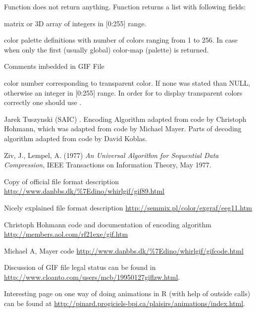 \begin{Value}
Function  does not return anything.
Function  returns a list with following fields:
\begin{ldescription}
\item[\code{image}] matrix or 3D array of integers in [0:255] range.
\item[\code{col}] color palette definitions with number of colors ranging from 1 
to 256. In case when  only the first (usually global) 
color-map (palette) is returned.
\item[\code{comment}] Comments imbedded in GIF File
\item[\code{transparent}] color number corresponding to transparent color. If none 
was stated than NULL, otherwise an integer in [0:255] range. In order for 
 to display transparent colors correctly one
should use . 
\end{ldescription}
\end{Value}
\begin{Author}\relax
Jarek Tuszynski (SAIC) . 
Encoding Algorithm adapted from code by Christoph Hohmann, which was adapted 
from code by Michael Mayer. Parts of decoding algorithm adapted from code by 
David Koblas.
\end{Author}
\begin{References}\relax
Ziv, J., Lempel, A. (1977) \emph{An Universal Algorithm for Sequential Data 
Compression}, IEEE Transactions on Information Theory, May 1977. 

Copy of official file format description  
\url{http://www.danbbs.dk/\%7Edino/whirlgif/gif89.html}

Nicely explained file format description  
\url{http://semmix.pl/color/exgraf/eeg11.htm}

Christoph Hohmann code and documentation of encoding algorithm 
\url{http://members.aol.com/rf21exe/gif.htm}

Michael A, Mayer code \url{http://www.danbbs.dk/\%7Edino/whirlgif/gifcode.html}

Discussion of GIF file legal status can be found in 
\url{http://www.cloanto.com/users/mcb/19950127giflzw.html}.

Interesting page on one way of doing animations in R (with help of outside 
calls) can be found at
\url{http://pinard.progiciels-bpi.ca/plaisirs/animations/index.html}.
\end{References}
